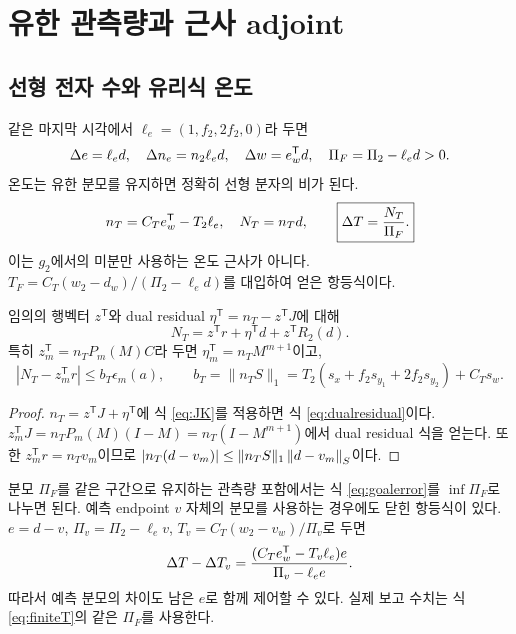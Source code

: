\section{유한 관측량과 근사 adjoint}\label{sec:adjoint}
\subsection{선형 전자 수와 유리식 온도}
같은 마지막 시각에서 $\ell_e=(1,f_2,2f_2,0)$라 두면
\begin{equation}
\Delta e=\ell_ed,\quad \Delta n_e=n_2\ell_ed,\quad
\Delta w=e_w^{\mathsf T}d,\quad \Pi_F=\Pi_2-\ell_ed>0.
\label{eq:readout}
\end{equation}
온도는 유한 분모를 유지하면 정확히 선형 분자의 비가 된다.
\begin{equation}
n_T=C_Te_w^{\mathsf T}-T_2\ell_e,\quad N_T=n_Td,
\qquad \boxed{\Delta T=\frac{N_T}{\Pi_F}.}
\label{eq:finiteT}
\end{equation}
이는 $g_2$에서의 미분만 사용하는 온도 근사가 아니다. $T_F=C_T(w_2-d_w)/(\Pi_2-\ell_ed)$를 대입하여 얻은 항등식이다.

\begin{theorem}[근사 adjoint의 유한 보정]\label{thm:adjoint}
임의의 행벡터 $z^{\mathsf T}$와 dual residual $\eta^{\mathsf T}=n_T-z^{\mathsf T}J$에 대해
\begin{equation}
N_T=z^{\mathsf T}r+\eta^{\mathsf T}d+z^{\mathsf T}R_2(d).
\label{eq:dualresidual}
\end{equation}
특히 $z_m^{\mathsf T}=n_TP_m(M)C$라 두면 $\eta_m^{\mathsf T}=n_TM^{m+1}$이고,
\begin{equation}
|N_T-z_m^{\mathsf T}r|\le b_T\epsilon_m(a),\qquad
b_T=\|n_TS\|_1=T_2(s_x+f_2s_{y_1}+2f_2s_{y_2})+C_Ts_w.
\label{eq:goalerror}
\end{equation}
\end{theorem}
\begin{proof}
$n_T=z^{\mathsf T}J+\eta^{\mathsf T}$에 식 \eqref{eq:JK}를 적용하면 식 \eqref{eq:dualresidual}이다. $z_m^{\mathsf T}J=n_TP_m(M)(I-M)=n_T(I-M^{m+1})$에서 dual residual 식을 얻는다. 또한 $z_m^{\mathsf T}r=n_Tv_m$이므로 $|n_T(d-v_m)|\le\|n_TS\|_1\left\lVert d-v_m\right\rVert_S$이다.
\end{proof}

분모 $\Pi_F$를 같은 구간으로 유지하는 관측량 포함에서는 식 \eqref{eq:goalerror}를 $\inf\Pi_F$로 나누면 된다. 예측 endpoint $v$ 자체의 분모를 사용하는 경우에도 닫힌 항등식이 있다. $e=d-v$, $\Pi_v=\Pi_2-\ell_ev$, $T_v=C_T(w_2-v_w)/\Pi_v$로 두면
\begin{equation}
\Delta T-\Delta T_v
=\frac{(C_Te_w^{\mathsf T}-T_v\ell_e)e}{\Pi_v-\ell_ee}.
\label{eq:tempredictor}
\end{equation}
따라서 예측 분모의 차이도 남은 $e$로 함께 제어할 수 있다. 실제 보고 수치는 식 \eqref{eq:finiteT}의 같은 $\Pi_F$를 사용한다.

